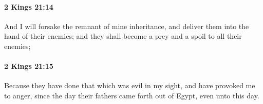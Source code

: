 		\paragraph{2 Kings 21:14} %
			\label{2KINGS-21-14}

			And I will forsake the remnant of mine inheritance, and deliver them into the hand of their enemies; and they shall become a prey and a spoil to all their enemies;


		\paragraph{2 Kings 21:15} %
			\label{2KINGS-21-15}

			Because they have done that which was evil in my sight, and have provoked me to anger, since the day their fathers came forth out of Egypt, even unto this day.


